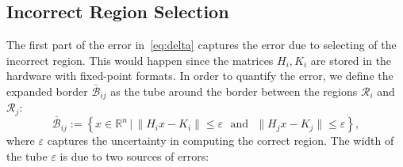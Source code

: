  \subsection{Incorrect Region Selection}
 	The first part of the error in~\autoref{eq:delta} captures the error due to
 	selecting of the incorrect region.
 	This would happen since the matrices $H_i,K_i$ are stored in the hardware with fixed-point formats. In order to quantify the error, we define the expanded border $\bar{\mathcal B}_{ij}$ as the tube around the border between the regions $\mathcal{R}_i$ and $\mathcal{R}_j$:
 	\begin{equation*}
 	\bar{\mathcal B}_{ij} := \left\{x\in\mathbb R^n\,|\, \| H_i x - K_i\| \le \varepsilon\,\, \text{ and }\,\, \| H_j x - K_j\| \le \varepsilon \right\},
 	\end{equation*}
 	where $\varepsilon$ captures the uncertainty in computing the correct region.
 	The width of the tube $\varepsilon$ is due to two sources of errors:
